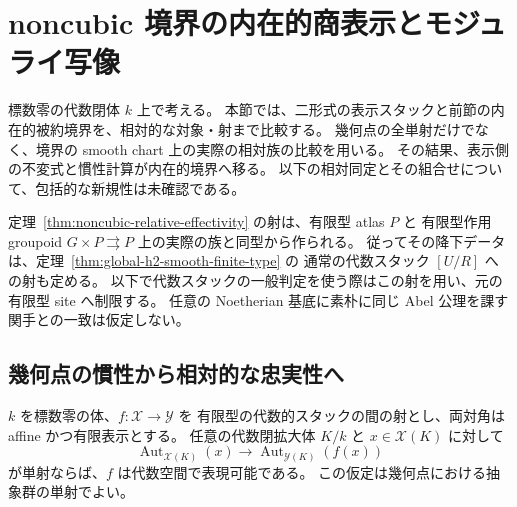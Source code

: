 \section{noncubic 境界の内在的商表示とモジュライ写像}
\label{sec:noncubic-boundary-comparison}

標数零の代数閉体 $k$ 上で考える。
本節では、二形式の表示スタックと前節の内在的被約境界を、相対的な対象・射まで比較する。
幾何点の全単射だけでなく、境界の smooth chart 上の実際の相対族の比較を用いる。
その結果、表示側の不変式と慣性計算が内在的境界へ移る。
以下の相対同定とその組合せについて、包括的な新規性は未確認である。

定理~\ref{thm:noncubic-relative-effectivity} の射は、有限型 atlas $P$ と
有限型作用 groupoid $G\times P\rightrightarrows P$ 上の実際の族と同型から作られる。
従ってその降下データは、定理~\ref{thm:global-h2-smooth-finite-type} の
通常の代数スタック $[U/R]$ への射も定める。
以下で代数スタックの一般判定を使う際はこの射を用い、元の有限型 site へ制限する。
任意の Noetherian 基底に素朴に同じ Abel 公理を課す関手との一致は仮定しない。

\subsection{幾何点の慣性から相対的な忠実性へ}

\begin{lemma}[標数零における相対慣性の消滅]
\label{lem:charzero-geometric-inertia-faithful}
$k$ を標数零の体、$f:\mathcal X\to\mathcal Y$ を
有限型の代数的スタックの間の射とし、両対角は affine かつ有限表示とする。
任意の代数閉拡大体 $K/k$ と $x\in\mathcal X(K)$ に対して
\[
 \operatorname{Aut}_{\mathcal X(K)}(x)
 \longrightarrow\operatorname{Aut}_{\mathcal Y(K)}(f(x))
\]
が単射ならば、$f$ は代数空間で表現可能である。
この仮定は幾何点における抽象群の単射でよい。
\end{lemma}

